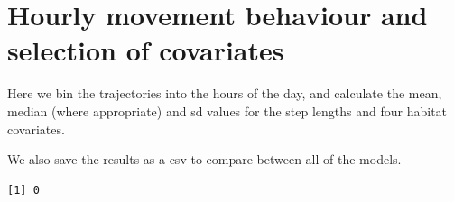 \documentclass[
  letterpaper,
  DIV=11,
  numbers=noendperiod]{scrartcl}
\newenvironment{Shaded}{\begin{snugshade}}{\end{snugshade}}
\newcommand{\CommentTok}[1]{\textcolor[rgb]{0.37,0.37,0.37}{#1}}
\newcommand{\FunctionTok}[1]{\textcolor[rgb]{0.28,0.35,0.67}{#1}}
\newcommand{\NormalTok}[1]{\textcolor[rgb]{0.00,0.23,0.31}{#1}}
\newcommand{\SpecialCharTok}[1]{\textcolor[rgb]{0.37,0.37,0.37}{#1}}
\begin{document}
\section{Hourly movement behaviour and selection of
covariates}\label{hourly-movement-behaviour-and-selection-of-covariates}

Here we bin the trajectories into the hours of the day, and calculate
the mean, median (where appropriate) and sd values for the step lengths
and four habitat covariates.

We also save the results as a csv to compare between all of the models.

\begin{Shaded}
\end{Shaded}

\begin{verbatim}
[1] 0
\end{verbatim}
\end{document}
